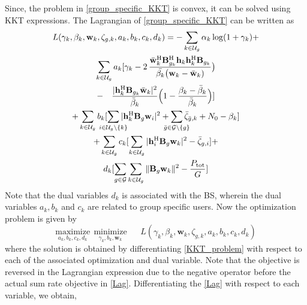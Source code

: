 \documentclass[letterpaper,conference,10pt]{IEEEtran}
\begin{document}
	Since, the problem in \eqref{group_specific_KKT} is convex, it can be solved using \ac{KKT} expressions. The Lagrangian of \eqref{group_specific_KKT} can be written as
	\begin{multline}\label{Lag}
	 L(\gamma_k, \beta_k, \mathbf{w}_k, \zeta_{g,k}, a_k, b_k, c_k, d_k) = -\sum_{k \in \mc{U}_g} \alpha_k \log({1 + \gamma_{k}}) +  \\  \sum_{k \in \mathcal{U}_g} a_k  [ \gamma_k - 2 \, \dfrac{\bar{\mathbf{w}}_{k}^{ \herm} \mbf{B}^{\herm}_{g_k} \mbf{h}_{k} \mbf{h}_{k}^{\herm} \mbf{B}_{g_k}}{\bar{\beta_k} \big( \mathbf{w}_{k} - \bar{\mathbf{w}}_{k} )}\big)  \\
	 - \quad \dfrac{|\mathbf{h}_{k}^{\herm} \mathbf{B}_{g_k} \bar{\mathbf{w}}_{k}|^2}{\bar{\beta}_{k}} \Big( 1 - \dfrac{\beta_{k} - \bar{\beta}_{k}}{\bar{\beta}_{k}} \Big)] \\ + \sum_{k \in \mathcal{U}_g} b_k [  \sum_{\mathclap{i \in \mathcal{U}_{g}\backslash \{k\} }} | \mathbf{h}_{k}^{\herm} \mathbf{B}_g \mathbf{w}_{i} |^2  + \sum_{\mathclap{\bar{g} \in {\mathcal{{G}}} \backslash \{g\}}} \bar{\zeta}_{\bar{g},k} + N_0  - \beta_k] \\ + \sum_{k \in \mathcal{U}_g} c_k [ \sum_{\substack{k \in \mathcal{U}_{{g}}}} | \mathbf{h}_{i}^{\herm} \mathbf{B}_{{g}} \mathbf{w}_{k} |^2 - \bar{\zeta}_{{g},i} ] + \\ d_k [\sum_{g \in \mathcal{G}}\sum_{k \in \mathcal{U}_g} \|\mathbf{B}_g\mathbf{w}_{k} \|^2 - \frac{P_{\mrm{tot}}}{G}]
	\end{multline}
	Note that the dual variables $d_k$ is associated with the \ac{BS}, wherein the dual variables $a_k, b_k$ and $c_k$ are related to group specific users. Now the optimization problem is given by
	\begin{equation} \label{KKT_problem}
			\underset{a_{k}, b_{k}, c_{k}, d_k} {\text{maximize}} \, \;	\underset{\gamma_{k}, b_{k}, \mathbf{w}_{k}} {\text{minimize}} \, \, \quad \; L(\gamma_k, \beta_k, \mathbf{w}_k, \zeta_{g,k}, a_k, b_k, c_k, d_k)
	\end{equation} 
	where the solution is obtained by differentiating \eqref{KKT_problem} with respect to each of the associated optimization and dual variable. Note that the objective is reversed in the Lagrangian expression due to the negative operator before the actual sum rate objective in \eqref{Lag}.	Differentiating the \eqref{Lag} with respect to each variable, we obtain,
\end{document}
